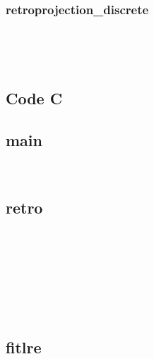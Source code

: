 \documentclass[conference]{IEEEtran}
\begin{document}
\subsubsection{retroprojection\_discrete }
\begin{figure}[H]
\centering

\label{fig:gallery}
\end{figure}
\newpage $ $
\newpage

\begin{figure}[H]
\centering

\label{fig:gallery}
\end{figure}
\newpage $ $
\newpage
\subsection{Code C}

\subsection{main }
\begin{figure}[H]
\centering

\label{fig:gallery}
\end{figure}
\newpage $ $
\newpage
\subsection{retro } 

\begin{figure}[H]
\centering

\label{fig:gallery}
\end{figure}
\newpage $ $
\newpage

\begin{figure}[H]
\centering

\label{fig:gallery}
\end{figure}
\newpage $ $
\newpage

\begin{figure}[H]
\centering

\label{fig:gallery}
\end{figure}
\newpage $ $
\newpage

\begin{figure}[H]
\centering

\label{fig:gallery}
\end{figure}
\newpage $ $
\newpage

\subsection{fitlre }
\end{document}
